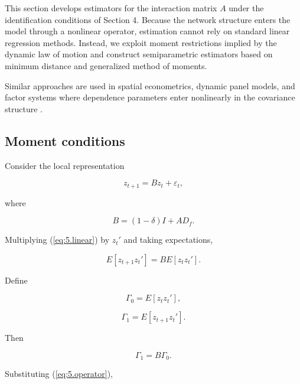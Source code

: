 \documentclass[12pt]{article}
\numberwithin{equation}{section}
\begin{document}
This section develops estimators for the interaction matrix $A$ under the
identification conditions of Section 4. Because the network structure enters
the model through a nonlinear operator, estimation cannot rely on standard
linear regression methods. Instead, we exploit moment restrictions implied
by the dynamic law of motion and construct semiparametric estimators based
on minimum distance and generalized method of moments.

Similar approaches are used in spatial econometrics, dynamic panel models,
and factor systems where dependence parameters enter nonlinearly in the
covariance structure \citep{hansen1982gmm, newey1994large, bai2009panel,
graham2017econometrics}.

\subsection{Moment conditions}

Consider the local representation

\begin{equation}
z_{t+1}
=
B z_t
+
\varepsilon_t,
\label{eq:5.linear}
\end{equation}

where

\begin{equation}
B
=
(1-\delta) I
+
A D_f.
\label{eq:5.operator}
\end{equation}

Multiplying (\ref{eq:5.linear}) by $z_t'$ and taking expectations,

\begin{equation}
E[z_{t+1} z_t']
=
B E[z_t z_t'].
\label{eq:5.moment1}
\end{equation}

Define

\begin{equation}
\Gamma_0
=
E[z_t z_t'],
\label{eq:5.gamma0}
\end{equation}

\begin{equation}
\Gamma_1
=
E[z_{t+1} z_t'].
\label{eq:5.gamma1}
\end{equation}

Then

\begin{equation}
\Gamma_1
=
B \Gamma_0.
\label{eq:5.restriction}
\end{equation}

Substituting (\ref{eq:5.operator}),
\end{document}
